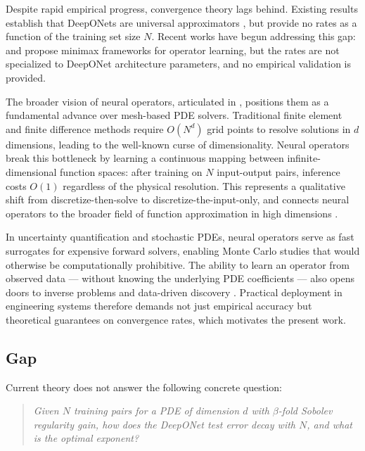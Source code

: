 \documentclass[12pt,a4paper]{article}
\begin{document}
Despite rapid empirical progress, convergence theory lags behind.
Existing results establish that DeepONets are universal approximators
\citep{lu2021deeponet,chen1995universal,deng2022deeponet,kovachki2023neuralop},
but provide no rates as a function of the training set size $N$.
Recent works have begun addressing this gap:
\citet{bouchard2023minimax} and \citet{brugiapaglia2026tour} propose minimax
frameworks for operator learning, but the rates are not specialized to DeepONet
architecture parameters, and no empirical validation is provided.

The broader vision of neural operators, articulated in \citet{kovachki2023neuralop},
positions them as a fundamental advance over mesh-based PDE solvers.
Traditional finite element and finite difference methods require $O(N^d)$ grid
points to resolve solutions in $d$ dimensions, leading to the well-known
curse of dimensionality.  Neural operators break this bottleneck by learning
a continuous mapping between infinite-dimensional function spaces: after training
on $N$ input-output pairs, inference costs $O(1)$ regardless of the physical
resolution.  This represents a qualitative shift from discretize-then-solve to
discretize-the-input-only, and connects neural operators to the broader field of
function approximation in high dimensions \citep{cohen2020approximation,chkifa2014sparse}.

In uncertainty quantification and stochastic PDEs, neural operators serve as
fast surrogates for expensive forward solvers, enabling Monte Carlo studies
that would otherwise be computationally prohibitive.  The ability to learn an
operator from observed data — without knowing the underlying PDE coefficients
— also opens doors to inverse problems and data-driven discovery
\citep{raissi2019physics,li2021physics}.  Practical deployment in engineering
systems therefore demands not just empirical accuracy but theoretical
guarantees on convergence rates, which motivates the present work.

\subsection{Gap}

Current theory does not answer the following concrete question:
\begin{quote}
    \emph{Given $N$ training pairs for a PDE of dimension $d$ with $\beta$-fold
        Sobolev regularity gain, how does the DeepONet test error decay with $N$,
    and what is the optimal exponent?}
\end{quote}
\end{document}
